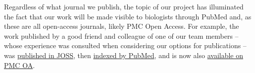 Regardless of what journal we publish, the topic of our project has illuminated the fact that our work will be made visible to biologists through PubMed and, as these are all open-access journals, likely PMC Open Access. For example, the work published by a good friend and colleague of one of our team members -- whose experience was consulted when considering our options for publications -- was \href{https://joss.theoj.org/papers/10.21105/joss.01708}{published in JOSS}, then \href{https://pubmed.ncbi.nlm.nih.gov/32337477/}{indexed by PubMed}, and is now also \href{https://joss.theoj.org/papers/10.21105/joss.01708}{available on PMC OA}.